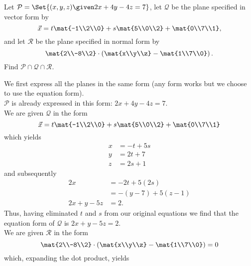 \begin{exercises}
\begin{problist}
		\prob
		Let $\mathcal P=
			\Set{(x,y,z)\given 2x+4y-4z=7}
		$,
		let $\mathcal Q$ be the plane specified in vector form by
		\[
			\vec x = t\mat{-1\\2\\0}+s\mat{5\\0\\2}+\mat{0\\7\\1},
		\]
		and let $\mathcal R$ be the plane specified in normal form by
		\[
			\mat{2\\-8\\2} \cdot \left(\mat{x\\y\\z}-\mat{1\\7\\0}\right).
		\]
		Find $\mathcal P\cap\mathcal Q\cap\mathcal R$.
		\begin{solution}
			We first express all the planes in the same form (any form works but we choose to use the equation form).\\
			$\mathcal{P}$ is already expressed in this form: $2x+4y-4z=7$.\\
			We are given $\mathcal{Q}$ in the form \[\vec x=t\mat{-1\\2\\0}+s\mat{5\\0\\2}+\mat{0\\7\\1}\]
			which yields 
			\begin{align*}
				x&=-t+5s\\
				y&=2t+7\\
				z&=2s+1
			\end{align*}
			and subsequently 
			\begin{align*}
				2x&=-2t+5(2s)\\
				&=-(y-7)+5(z-1)\\
				2x+y-5z&=2.
			\end{align*}
			Thus, having eliminated $t$ and $s$ from our original equations we find that the equation form of $\mathcal{Q}$ is $2x+y-5z=2$.\\
			We are given $\mathcal{R}$ in the form \[\mat{2\\-8\\2}\cdot \left(\mat{x\\y\\z}-\mat{1\\7\\0}\right)=0\]
			which, expanding the dot product, yields 

\end{solution}
\end{problist}
\end{exercises}
